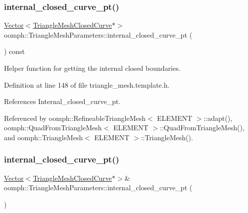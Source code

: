 \subsubsection{\texorpdfstring{internal\+\_\+closed\+\_\+curve\+\_\+pt()}{internal\_closed\_curve\_pt()}\hspace{0.1cm}{\footnotesize\ttfamily [1/2]}}
{\footnotesize\ttfamily \hyperlink{classoomph_1_1Vector}{Vector}$<$\hyperlink{classoomph_1_1TriangleMeshClosedCurve}{Triangle\+Mesh\+Closed\+Curve}$\ast$$>$ oomph\+::\+Triangle\+Mesh\+Parameters\+::internal\+\_\+closed\+\_\+curve\+\_\+pt (\begin{DoxyParamCaption}{ }\end{DoxyParamCaption}) const\hspace{0.3cm}{\ttfamily [inline]}}



Helper function for getting the internal closed boundaries. 



Definition at line 148 of file triangle\+\_\+mesh.\+template.\+h.



References Internal\+\_\+closed\+\_\+curve\+\_\+pt.



Referenced by oomph\+::\+Refineable\+Triangle\+Mesh$<$ E\+L\+E\+M\+E\+N\+T $>$\+::adapt(), oomph\+::\+Quad\+From\+Triangle\+Mesh$<$ E\+L\+E\+M\+E\+N\+T $>$\+::\+Quad\+From\+Triangle\+Mesh(), and oomph\+::\+Triangle\+Mesh$<$ E\+L\+E\+M\+E\+N\+T $>$\+::\+Triangle\+Mesh().

\mbox{\label{classoomph_1_1TriangleMeshParameters_a7a539affa9d589ef9c14ae7d7bb7f458}} 
\subsubsection{\texorpdfstring{internal\+\_\+closed\+\_\+curve\+\_\+pt()}{internal\_closed\_curve\_pt()}\hspace{0.1cm}{\footnotesize\ttfamily [2/2]}}
{\footnotesize\ttfamily \hyperlink{classoomph_1_1Vector}{Vector}$<$\hyperlink{classoomph_1_1TriangleMeshClosedCurve}{Triangle\+Mesh\+Closed\+Curve}$\ast$$>$\& oomph\+::\+Triangle\+Mesh\+Parameters\+::internal\+\_\+closed\+\_\+curve\+\_\+pt (\begin{DoxyParamCaption}{ }\end{DoxyParamCaption})\hspace{0.3cm}{\ttfamily [inline]}}




